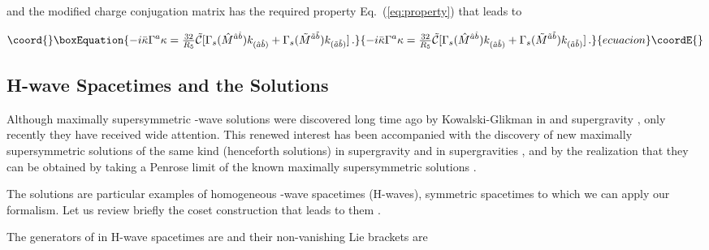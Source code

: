 \documentclass[12pt,a4paper]{article}
\begin{document}
\noindent
and the modified charge conjugation matrix has the required property
Eq.~(\ref{eq:property}) that leads to

\begin{equation}\coord{}\boxEquation{
-i\bar{\kappa}\Gamma^{a}\kappa = {\textstyle\frac{32}{R_{5}}} 
\tilde{\mathcal{C}}[\Gamma_{s}(\hat{M}^{\hat{a}\hat{b}})k_{(\hat{a}\hat{b})}
+\Gamma_{s}(\tilde{M}^{\tilde{a}\tilde{b}})
k_{(\tilde{a}\tilde{b})}]\, .
}{
-i\bar{\kappa}\Gamma^{a}\kappa = {\textstyle\frac{32}{R_{5}}} 
\tilde{\mathcal{C}}[\Gamma_{s}(\hat{M}^{\hat{a}\hat{b}})k_{(\hat{a}\hat{b})}
+\Gamma_{s}(\tilde{M}^{\tilde{a}\tilde{b}})
k_{(\tilde{a}\tilde{b})}]\, .
}{ecuacion}\coordE{}\end{equation}


\subsection{H\coordHE{}-wave Spacetimes and the \coordHE{} Solutions}
\label{sec-HppKG}

Although maximally supersymmetric \coordHE{}-wave solutions were discovered
long time ago by Kowalski-Glikman in \coordHE{} and \coordHE{}
supergravity \cite{Kowalski-Glikman:wv,Kowalski-Glikman:1985im}, only
recently they have received wide attention. This renewed interest has
been accompanied with the discovery of new maximally supersymmetric
solutions of the same kind (henceforth \coordHE{} solutions) in \coordHE{}
supergravity \cite{Blau:2001ne} and in \coordHE{} supergravities
\cite{Meessen:2001vx}, and by the realization that they can be
obtained by taking a Penrose limit \cite{kn:Pen6,Gueven:2000ru} of the
known \coordHE{} maximally supersymmetric solutions
\cite{Blau:2002dy,Blau:2002rg}.

The \coordHE{} solutions are particular examples of homogeneous \coordHE{}-wave
spacetimes (H\coordHE{}-waves), symmetric spacetimes to which we can apply
our formalism. Let us review briefly the coset construction that leads
to them \cite{kn:CaWa,Figueroa-O'Farrill:2001nz}.

The generators of \coordHE{} in H\coordHE{}-wave spacetimes are
\coordHE{}  \coordHE{} and their
non-vanishing Lie brackets are
\end{document}
